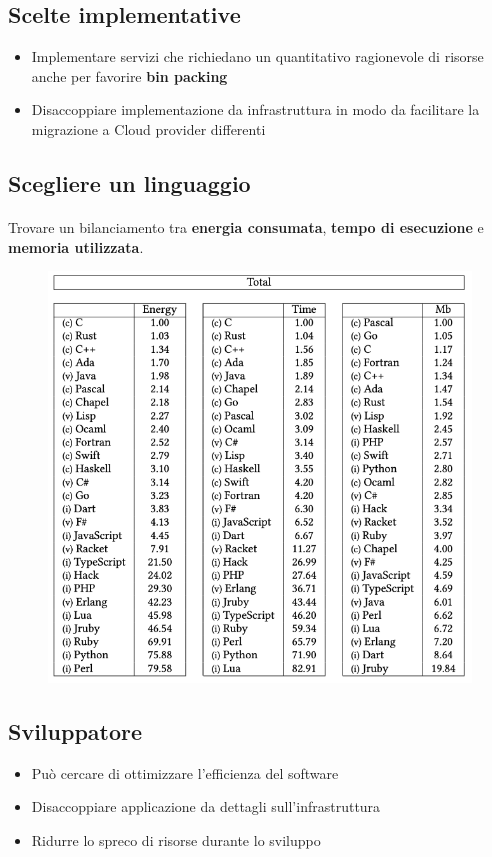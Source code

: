 \documentclass[a4paper, 12pt]{report}
\begin{document}
          \subsection{Scelte implementative}
          \begin{itemize}
            \item Implementare servizi che richiedano un quantitativo ragionevole di risorse anche per favorire \textbf{bin packing}
            \item Disaccoppiare implementazione da infrastruttura in modo da facilitare la migrazione a Cloud provider differenti
          \end{itemize}
          \subsection{Scegliere un linguaggio}
          \paragraph{}Trovare un bilanciamento tra \textbf{energia consumata}, \textbf{tempo di esecuzione} e \textbf{memoria utilizzata}.
          \begin{figure}[h]
            \centering
            \includegraphics[scale=0.5]{Immagini/Linguaggi.png}
          \end{figure}
          \subsection{Sviluppatore}
          \begin{itemize}
            \item Può cercare di ottimizzare l'efficienza del software 
            \item Disaccoppiare applicazione da dettagli sull'infrastruttura
            \item Ridurre lo spreco di risorse durante lo sviluppo
          \end{itemize}
\end{document}
